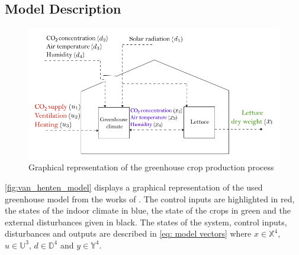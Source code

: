 \subsection{Model Description}
\begin{figure}[H]
	\centering
	\includegraphics[width = 0.75\linewidth]{figures/van_henten_model.png}
	\caption{Graphical representation of the greenhouse crop production process \cite{hentenGreenhouseClimateManagement1994}}
	\label{fig:van_henten_model}
\end{figure}

\autoref{fig:van_henten_model} displays a graphical representation of the used greenhouse model from the works of \cite{hentenGreenhouseClimateManagement1994}. The control inputs are highlighted in red, the states of the indoor climate in blue, the state of the crops in green and the external disturbances given in black. The states of the system, control inputs, disturbances and outputs are described in \autoref{eq: model vectors} where $x \in \mathbb{X}^4$, $u \in \mathbb{U}^3$, $d \in \mathbb{D}^4$ and $y \in \mathbb{Y}^4$.

